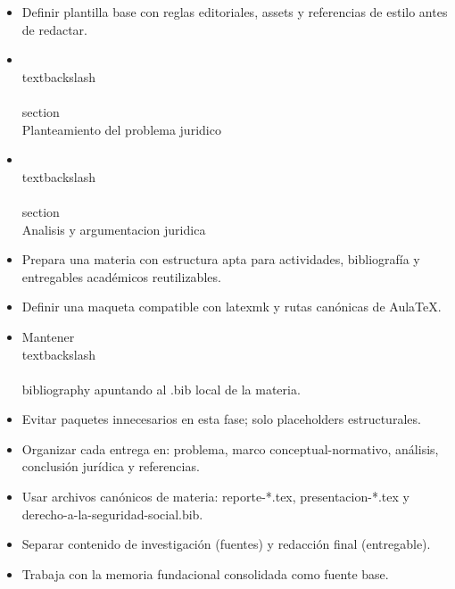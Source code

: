 \documentclass[12pt]{article}
\begin{document}
\begin{itemize}[leftmargin=*]
  \item Definir plantilla base con reglas editoriales, assets y referencias de estilo antes de redactar.
  \item \\textbackslash\\{\\}section\\{Planteamiento del problema juridico\\}
  \item \\textbackslash\\{\\}section\\{Analisis y argumentacion juridica\\}
  \item Prepara una materia con estructura apta para actividades, bibliografía y entregables académicos reutilizables.
  \item Definir una maqueta compatible con latexmk y rutas canónicas de AulaTeX.
  \item Mantener \\textbackslash\\{\\}bibliography apuntando al .bib local de la materia.
  \item Evitar paquetes innecesarios en esta fase; solo placeholders estructurales.
  \item Organizar cada entrega en: problema, marco conceptual-normativo, análisis, conclusión jurídica y referencias.
  \item Usar archivos canónicos de materia: reporte-*.tex, presentacion-*.tex y derecho-a-la-seguridad-social.bib.
  \item Separar contenido de investigación (fuentes) y redacción final (entregable).
  \item Trabaja con la memoria fundacional consolidada como fuente base.
\end{itemize}
\end{document}
